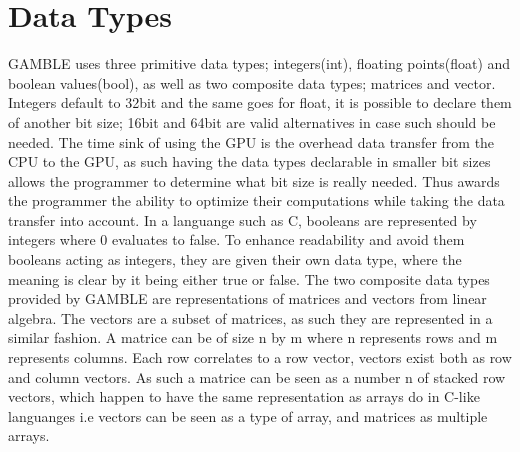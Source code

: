 \section{Data Types}
GAMBLE uses three primitive data types; integers(int), floating points(float) and boolean values(bool), as well as two composite data types; matrices and vector.
Integers default to 32bit and the same goes for float, it is possible to declare them of another bit size; 16bit and 64bit are valid alternatives in case such should be needed.%
The time sink of using the GPU is the overhead data transfer from the CPU to the GPU, as such having the data types declarable in smaller bit sizes allows the programmer to determine what bit size is really needed.
Thus awards the programmer the ability to optimize their computations while taking the data transfer into account.
In a languange such as C, booleans are represented by integers where 0 evaluates to false.
To enhance readability and avoid them booleans acting as integers, they are given their own data type, where the meaning is clear by it being either true or false.
The two composite data types provided by GAMBLE are representations of matrices and vectors from linear algebra.
The vectors are a subset of matrices, as such they are represented in a similar fashion.
A matrice can be of size n by m where n represents rows and m represents columns.
Each row correlates to a row vector, vectors exist both as row and column vectors.
As such a matrice can be seen as a number n of stacked row vectors, which happen to have the same representation as arrays do in C-like languanges i.e vectors can be seen as a type of array, and matrices as multiple arrays.


